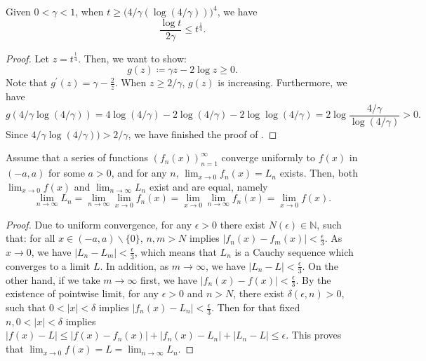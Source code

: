 \begin{lemma}
\label{lem: log over linear}
Given $0<\gamma <1$, when $t \ge \big(4/\gamma ( \log( 4/\gamma))\big)^4$, we have 
\[
    \frac{\log t}{2 \gamma} \le  t^{\frac{1}{4}}. 
\]
\end{lemma}
\begin{proof}

Let $z = t^{\frac{1}{4}}$. Then, we want to show: 
\[
   g(z) \coloneqq  \gamma z  - 2 \log z \ge 0. 
\]
Note that $g^\prime (z) = \gamma - \frac{2}{z}$. When $z \ge 2/\gamma$, $g(z)$ is increasing. Furthermore, we have 
\[
    g(4/\gamma \log( 4/\gamma))  = 4 \log(4/\gamma)  -  2 \log(4/ \gamma)   - 2 \log \log(4/\gamma) = 2\log \frac{4/\gamma}{\log(4/\gamma)}>0. 
\]
Since $4/\gamma \log( 4/\gamma)) > 2/\gamma$, we have finished the proof of .
\end{proof}



\begin{lemma}
\label{lem:exchange-limit}
Assume that a series of functions $(f_n(x))_{n=1}^\infty$ converge uniformly to $f(x)$ in $(-a,a)$ for some $a>0$, and for any $n$, $\lim_{x\to 0} f_n(x) = L_n$ exists. Then, both $\lim_{x \to 0} f(x)$ and $\lim_{n \to \infty} L_n$ exist and are equal, namely
\[ 
\lim_{n\to\infty} L_n = \lim_{n\to \infty} \lim_{x\to 0} f_n(x) = \lim_{x\to 0} \lim_{n\to \infty} f_n(x) = \lim_{x\to 0} f(x). 
\]

\end{lemma}

\begin{proof}
Due to uniform convergence, for any $\epsilon>0$ there exist $N(\epsilon) \in \mathbb{N}$, such that:
for all $x \in (-a, a) \backslash \{ 0 \}$, $n, m>N$ implies $\left|f_n(x)-f_m(x)\right|<\frac{\epsilon}{3}$.
As $x \rightarrow 0$, we have $\left|L_n-L_m\right|<\frac{\epsilon}{3}$, which means that $L_n$ is a Cauchy sequence which converges to a limit $L$. In addition, as $m \rightarrow \infty$, we have $\left|L_n-L\right|<\frac{\epsilon}{3}$.
On the other hand, if we take $m \rightarrow \infty$ first, we have $\left|f_n(x)-f(x)\right|<\frac{\epsilon}{3}$.
By the existence of pointwise limit, for any $\epsilon>0$ and $n>N$, there exist $\delta(\epsilon, n)>0$, such that $0<|x|<\delta$ implies $\left|f_n(x)-L_n\right|<\frac{\epsilon}{3}$.
Then for that fixed $n, 0<|x|<\delta$ implies $|f(x)-L| \leq\left|f(x)-f_n(x)\right|+\left|f_n(x)-L_n\right|+\left|L_n-L\right| \leq \epsilon$.
This proves that $\lim _{x \rightarrow 0} f(x)=L=\lim _{n \rightarrow \infty} L_n$.
\end{proof}

